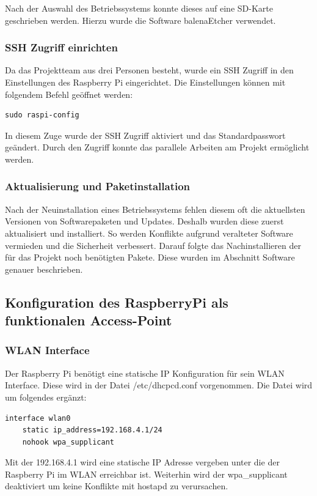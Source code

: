 \documentclass[a4paper,11pt,singlespacing]{article}
\begin{document}
        	Nach der Auswahl des Betriebssystems konnte dieses auf eine SD-Karte geschrieben werden.
        	Hierzu wurde die Software balenaEtcher verwendet.   
    	
    	\subsubsection{SSH Zugriff einrichten}
        	Da das Projektteam aus drei Personen besteht, wurde ein SSH Zugriff in den Einstellungen des Raspberry Pi eingerichtet. Die Einstellungen können mit folgendem Befehl geöffnet werden: 
        \begin{lstlisting}
sudo raspi-config
        \end{lstlisting} 
    	
        In diesem Zuge wurde der SSH Zugriff aktiviert und das Standardpasswort geändert. Durch den  Zugriff konnte das parallele Arbeiten am Projekt ermöglicht werden. 
    	
    	\subsubsection{Aktualisierung und Paketinstallation}
        	Nach der Neuinstallation eines Betriebssystems fehlen diesem oft die aktuellsten Versionen von Softwarepaketen und Updates. Deshalb wurden diese zuerst aktualisiert und installiert. So werden Konflikte aufgrund veralteter Software vermieden und die Sicherheit verbessert.  
        	Darauf folgte das Nachinstallieren der für das Projekt noch benötigten Pakete. Diese wurden im Abschnitt Software genauer beschrieben. 
    	
    	
    
    	\subsection{Konfiguration des RaspberryPi als funktionalen Access-Point}
            \subsubsection{WLAN Interface}
                Der Raspberry Pi benötigt eine statische IP Konfiguration für sein WLAN Interface. Diese wird in der Datei /etc/dhcpcd.conf vorgenommen. Die Datei wird um folgendes ergänzt:\\
                \lstset{
                language=bash,
                }
                \begin{lstlisting}
interface wlan0
    static ip_address=192.168.4.1/24
    nohook wpa_supplicant
                \end{lstlisting} 
                Mit der 192.168.4.1 wird eine statische IP Adresse vergeben unter die der Raspberry Pi im WLAN erreichbar ist. Weiterhin wird der wpa{\_}supplicant deaktiviert um keine Konflikte mit hostapd zu verursachen. 
            
\end{document}

